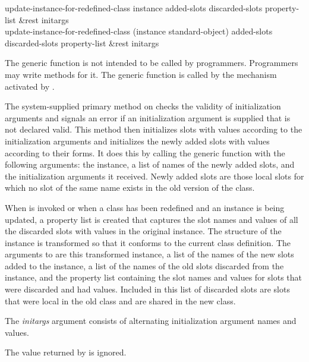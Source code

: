 \begin{defun}
update-instance-for-redefined-class instance added-slots
    discarded-slots property-list &rest initargs \\
update-instance-for-redefined-class (instance standard-object) added-slots
    discarded-slots property-list &rest initargs

\relax
{}
\noindent
The generic function  is not
intended to be called by programmers. Programmers may
write methods for it.  The generic function 
 is called by the mechanism
activated by .

The system-supplied primary method on 
 checks the validity of
initialization arguments and signals an error if an initialization
argument is supplied that is not declared valid.  This method then
initializes slots with values according to the initialization
arguments and initializes the newly added slots with values according
to their  forms.  It does this by calling the generic
function  with the following arguments: the instance,
a list of names of the newly added slots, and the initialization
arguments it received.  Newly added slots are those local slots for which
no slot of the same name exists in the old version of the class.





When  is invoked or when a class has been
redefined and an instance is being updated, a property list is created
that captures the slot names and values of all the discarded slots with
values in the original instance.  The structure of the instance is
transformed so that it conforms to the current class definition.  The
arguments to  are this
transformed instance, a list of the names of the new slots added to the
instance, a list of the names of the old slots discarded from the
instance, and the property list containing the slot names and values for
slots that were discarded and had values.  Included in this list of
discarded slots are slots that were local in the old class and are
shared in the new class.

The \emph{initargs\/} argument consists of alternating initialization
argument names and values.


The value returned by  is ignored.



\end{defun}
